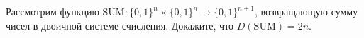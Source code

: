 Рассмотрим функцию $\mathrm{SUM}: \{0, 1\}^n \times \{0, 1\}^n \to \{0, 1\}^{n + 1}$, возвращающую сумму
чисел в двоичной системе счисления. Докажите, что $D(\mathrm{SUM}) = 2n$.